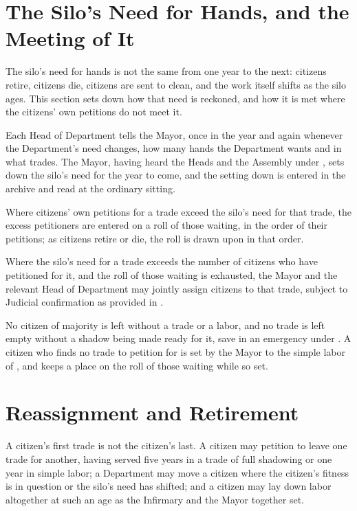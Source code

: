 \section{The Silo's Need for Hands, and the Meeting of It}
\label{sec:labor:silos-need-for-hands}

The silo's need for hands is not the same from one year to the next: citizens retire, citizens die, citizens are sent to clean, and the work itself shifts as the silo ages. This section sets down how that need is reckoned, and how it is met where the citizens' own petitions do not meet it.

\begin{clauses}
\item Each Head of Department tells the Mayor, once in the year and again whenever the Department's need changes, how many hands the Department wants and in what trades. The Mayor, having heard the Heads and the Assembly under , sets down the silo's need for the year to come, and the setting down is entered in the archive and read at the ordinary sitting.
\item Where citizens' own petitions for a trade exceed the silo's need for that trade, the excess petitioners are entered on a roll of those waiting, in the order of their petitions; as citizens retire or die, the roll is drawn upon in that order.
\item Where the silo's need for a trade exceeds the number of citizens who have petitioned for it, and the roll of those waiting is exhausted, the Mayor and the relevant Head of Department may jointly assign citizens to that trade, subject to Judicial confirmation as provided in .
\item No citizen of majority is left without a trade or a labor, and no trade is left empty without a shadow being made ready for it, save in an emergency under . A citizen who finds no trade to petition for is set by the Mayor to the simple labor of , and keeps a place on the roll of those waiting while so set.
\end{clauses}

\section{Reassignment and Retirement}
\label{sec:labor:reassignment-and-retirement}

A citizen's first trade is not the citizen's last. A citizen may petition to leave one trade for another, having served five years in a trade of full shadowing or one year in simple labor; a Department may move a citizen where the citizen's fitness is in question or the silo's need has shifted; and a citizen may lay down labor altogether at such an age as the Infirmary and the Mayor together set.


